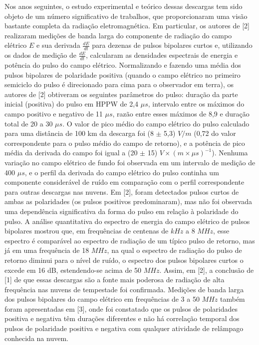 \documentclass[a4paper, 12pt, onecolumn,singlespacing]{article}
\begin{document}
	Nos anos seguintes, o estudo experimental e teórico dessas descargas tem sido objeto de um número significativo de trabalhos, que proporcionaram uma visão bastante completa da radiação eletromagnética. Em particular, os autores de [2] realizaram medições de banda larga do componente de radiação do campo elétrico $E$ e sua derivada $\frac{dE}{dt}$ para dezenas de pulsos bipolares curtos e, utilizando os dados de medição de $\frac{dE}{dt}$, calcularam as densidades espectrais de energia e potência do pulso do campo elétrico. Normalizando e fazendo uma média dos pulsos bipolares de polaridade positiva (quando o campo elétrico no primeiro semiciclo do pulso é direcionado para cima para o observador em terra), os autores de [2] obtiveram os seguintes parâmetros do pulso: duração da parte inicial (positiva) do pulso em HPPW de 2,4 $\mu s$, intervalo entre os máximos do campo positivo e negativo de 11 $\mu s$, razão entre esses máximos de 8,9 e duração total de 20 a 30 $\mu s$. O valor de pico médio do campo elétrico do pulso calculado para uma distância de 100 km da descarga foi (8 $\pm$ 5,3) $V/m$ (0,72 do valor correspondente para o pulso médio do campo de retorno), e a potência de pico média da derivada do campo foi igual a (20 $\pm$ 15) $V \times (m \times \mu s)^{-1}$). Nenhuma variação no campo elétrico de fundo foi observada em um intervalo de medição de 400 $\mu s$, e o perfil da derivada do campo elétrico do pulso continha um componente considerável de ruído em comparação com o perfil correspondente para outras descargas nas nuvens. Em [2], foram detectados pulsos curtos de ambas as polaridades (os pulsos positivos predominaram), mas não foi observada uma dependência significativa da forma do pulso em relação à polaridade do pulso. A análise quantitativa do espectro de energia do campo elétrico de pulsos bipolares mostrou que, em frequências de centenas de $kHz$ a 8 $MHz$, esse espectro é comparável ao espectro de radiação de um típico pulso de retorno, mas já em uma frequência de 18 $MHz$, na qual o espectro de radiação do pulso de retorno diminui para o nível de ruído, o espectro dos pulsos bipolares curtos o excede em 16 dB, estendendo-se acima de 50 $MHz$. Assim, em [2], a conclusão de [1] de que essas descargas são a fonte mais poderosa de radiação de alta frequência nas nuvens de tempestade foi confirmada. Medições de banda larga dos pulsos bipolares do campo elétrico em frequências de 3 a 50 $MHz$ também foram apresentadas em [3], onde foi constatado que os pulsos de polaridades positiva e negativa têm durações diferentes e não há correlação temporal dos pulsos de polaridade positiva e negativa com qualquer atividade de relâmpago conhecida na nuvem.
	
\end{document}
